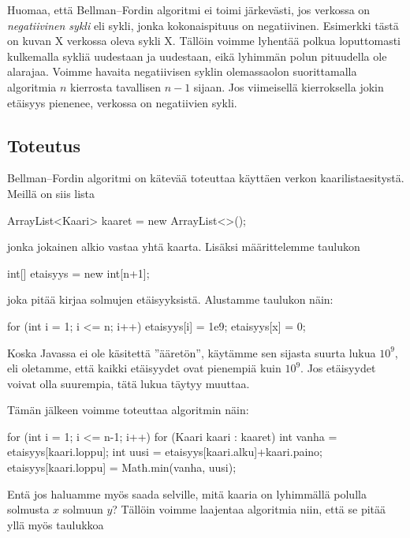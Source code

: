 Huomaa, että Bellman–Fordin algoritmi ei toimi järkevästi,
jos verkossa on \emph{negatiivinen sykli}
eli sykli, jonka kokonaispituus on negatiivinen.
Esimerkki tästä on kuvan X verkossa oleva sykli X.
Tällöin voimme lyhentää polkua loputtomasti kulkemalla
sykliä uudestaan ja uudestaan, eikä lyhimmän polun pituudella ole alarajaa.
Voimme havaita negatiivisen syklin olemassaolon suorittamalla
algoritmia $n$ kierrosta tavallisen $n-1$ sijaan.
Jos viimeisellä kierroksella jokin etäisyys pienenee,
verkossa on negatiivien sykli.

\subsection{Toteutus}

Bellman–Fordin algoritmi on kätevää toteuttaa käyttäen verkon
kaarilista\-esitystä. Meillä on siis lista

\begin{code}
ArrayList<Kaari> kaaret = new ArrayList<>();
\end{code}

jonka jokainen alkio vastaa yhtä kaarta.
Lisäksi määrittelemme taulukon

\begin{code}
int[] etaisyys = new int[n+1];
\end{code}

joka pitää kirjaa solmujen etäisyyksistä.
Alustamme taulukon näin:

\begin{code}
for (int i = 1; i <= n; i++) {
    etaisyys[i] = 1e9;
}
etaisyys[x] = 0;
\end{code}

Koska Javassa ei ole käsitettä ''ääretön'', käytämme sen sijasta
suurta lukua $10^9$, eli oletamme, että kaikki etäisyydet
ovat pienempiä kuin $10^9$.
Jos etäisyydet voivat olla suurempia, tätä lukua täytyy muuttaa.

Tämän jälkeen voimme toteuttaa algoritmin näin:

\begin{code}
for (int i = 1; i <= n-1; i++) {
    for (Kaari kaari : kaaret) {
        int vanha = etaisyys[kaari.loppu];
        int uusi = etaisyys[kaari.alku]+kaari.paino;
        etaisyys[kaari.loppu] = Math.min(vanha, uusi);
    }
}
\end{code}

Entä jos haluamme myös saada selville,
mitä kaaria on lyhimmällä polulla solmusta $x$ solmuun $y$?
Tällöin voimme laajentaa algoritmia niin,
että se pitää yllä myös taulukkoa

